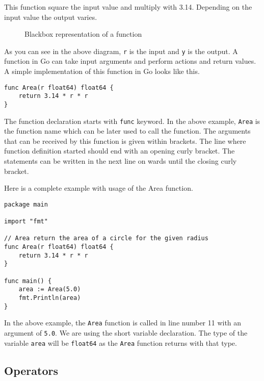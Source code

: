 This function square the input value and multiply with 3.14.
Depending on the input value the output varies.

\begin{figure}[h!]
\centering
{}
\caption{Blackbox representation of a function}
\end{figure}

As you can see in the above diagram, \texttt{r} is the input
and \texttt{y} is the output.  A function in Go can take input
arguments and perform actions and return values.  A simple
implementation of this function in Go looks like this.

\begin{lstlisting}[numbers=none]
func Area(r float64) float64 {
    return 3.14 * r * r
}
\end{lstlisting}

The function declaration starts with \texttt{func} keyword.  In the
above example, \texttt{Area} is the function name which can be later
used to call the function.  The arguments that can be received by this
function is given within brackets.  The line where function definition
started should end with an opening curly bracket.  The statements can
be written in the next line on wards until the closing curly bracket.

Here is a complete example with usage of the Area function.

\begin{lstlisting}[caption=Function usage]
package main

import "fmt"

// Area return the area of a circle for the given radius
func Area(r float64) float64 {
    return 3.14 * r * r
}

func main() {
    area := Area(5.0)
    fmt.Println(area)
}
\end{lstlisting}

In the above example, the \texttt{Area} function is called in line
number 11 with an argument of \texttt{5.0}.  We are using the short
variable declaration.  The type of the variable \texttt{area} will be
\texttt{float64} as the \texttt{Area} function returns with that type.

\subsection{Operators}

